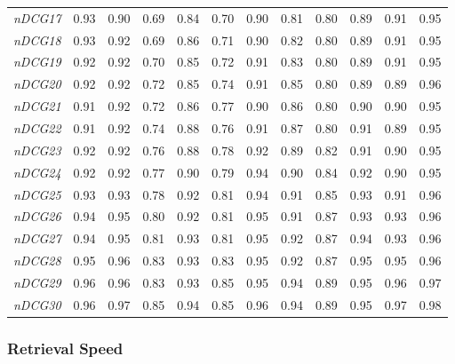 \begin{table}[tb!]
{\begin{tabular}{c||c|c|c|c|c|c|c|c|c|c|c}
\textit{nDCG17} & 0.93 & 0.90 & 0.69 & 0.84 & 0.70 & 0.90 & 0.81 & 0.80 & 0.89 & 0.91 & 0.95 \\
\textit{nDCG18} & 0.93 & 0.92 & 0.69 & 0.86 & 0.71 & 0.90 & 0.82 & 0.80 & 0.89 & 0.91 & 0.95 \\
\textit{nDCG19} & 0.92 & 0.92 & 0.70 & 0.85 & 0.72 & 0.91 & 0.83 & 0.80 & 0.89 & 0.91 & 0.95 \\
\textit{nDCG20} & 0.92 & 0.92 & 0.72 & 0.85 & 0.74 & 0.91 & 0.85 & 0.80 & 0.89 & 0.89 & 0.96 \\
\textit{nDCG21} & 0.91 & 0.92 & 0.72 & 0.86 & 0.77 & 0.90 & 0.86 & 0.80 & 0.90 & 0.90 & 0.95 \\
\textit{nDCG22} & 0.91 & 0.92 & 0.74 & 0.88 & 0.76 & 0.91 & 0.87 & 0.80 & 0.91 & 0.89 & 0.95 \\
\textit{nDCG23} & 0.92 & 0.92 & 0.76 & 0.88 & 0.78 & 0.92 & 0.89 & 0.82 & 0.91 & 0.90 & 0.95 \\
\textit{nDCG24} & 0.92 & 0.92 & 0.77 & 0.90 & 0.79 & 0.94 & 0.90 & 0.84 & 0.92 & 0.90 & 0.95 \\
\textit{nDCG25} & 0.93 & 0.93 & 0.78 & 0.92 & 0.81 & 0.94 & 0.91 & 0.85 & 0.93 & 0.91 & 0.96 \\
\textit{nDCG26} & 0.94 & 0.95 & 0.80 & 0.92 & 0.81 & 0.95 & 0.91 & 0.87 & 0.93 & 0.93 & 0.96 \\
\textit{nDCG27} & 0.94 & 0.95 & 0.81 & 0.93 & 0.81 & 0.95 & 0.92 & 0.87 & 0.94 & 0.93 & 0.96 \\
\textit{nDCG28} & 0.95 & 0.96 & 0.83 & 0.93 & 0.83 & 0.95 & 0.92 & 0.87 & 0.95 & 0.95 & 0.96 \\
\textit{nDCG29} & 0.96 & 0.96 & 0.83 & 0.93 & 0.85 & 0.95 & 0.94 & 0.89 & 0.95 & 0.96 & 0.97 \\
\textit{nDCG30} & 0.96 & 0.97 & 0.85 & 0.94 & 0.85 & 0.96 & 0.94 & 0.89 & 0.95 & 0.97 & 0.98 \\
\end{tabular}}
\end{table}

\vspace{1em}
\subsubsection{Retrieval Speed}

